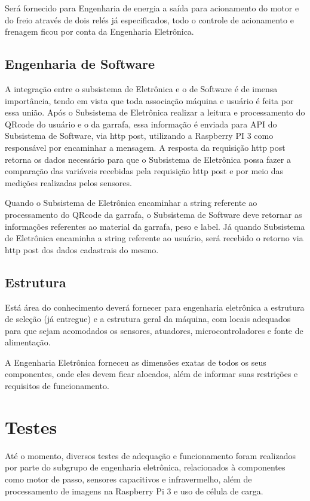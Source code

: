 Será fornecido para Engenharia de energia a saída para acionamento do motor e do freio através de dois relés já especificados, todo o controle de acionamento e frenagem ficou por conta da Engenharia Eletrônica. 

\subsection{Engenharia de Software}
A integração entre o subsistema de Eletrônica e o de Software é de imensa importância, tendo em vista que toda associação máquina e usuário é feita por essa união. Após o Subsistema de Eletrônica realizar a leitura e processamento do QRcode do usuário e o da garrafa, essa informação é enviada para API do Subsistema de Software, via http post, utilizando a Raspberry PI 3 como responsável por encaminhar a mensagem. A resposta da requisição http post retorna os dados necessário para que o Subsistema de Eletrônica possa fazer a comparação das variáveis recebidas pela requisição http post e por meio das medições realizadas pelos sensores. 

Quando o Subsistema de Eletrônica encaminhar a string referente ao processamento do QRcode da garrafa, o Subsistema de Software deve retornar as informações referentes ao material da garrafa, peso e label. Já quando Subsistema de Eletrônica encaminha a string referente ao usuário, será recebido o retorno via http post dos dados cadastrais do mesmo. 

\subsection{Estrutura}
Está área do conhecimento deverá fornecer para engenharia eletrônica a estrutura de seleção (já entregue) e a estrutura geral da máquina, com locais adequados para que sejam acomodados os sensores, atuadores, microcontroladores e fonte de alimentação.

A Engenharia Eletrônica forneceu as dimensões exatas de todos os seus componentes, onde eles devem ficar alocados, além de informar suas restrições e requisitos de funcionamento.

\section{Testes}
Até o momento, diversos testes de adequação e funcionamento foram realizados por parte do subgrupo de engenharia eletrônica, relacionados à componentes como motor de passo, sensores capacitivos e infravermelho, além de processamento de imagens na Raspberry Pi 3 e uso de célula de carga.

